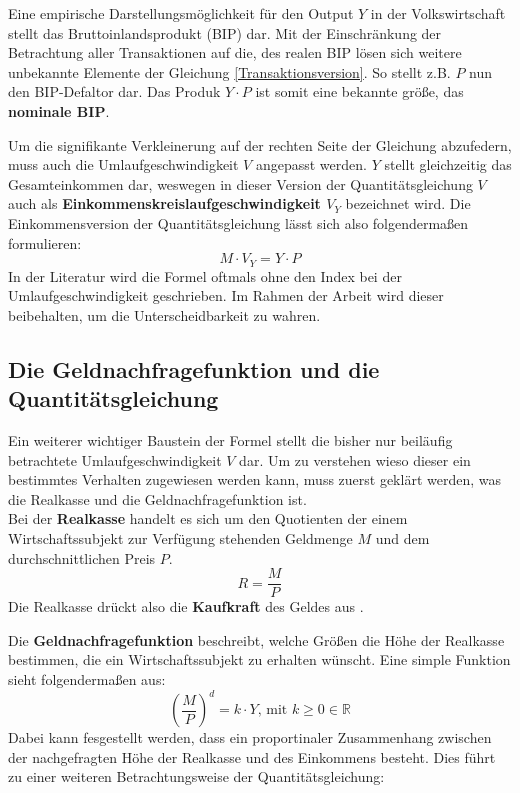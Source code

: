 Eine empirische Darstellungsmöglichkeit für den Output $Y$ in der Volkswirtschaft stellt das Bruttoinlandsprodukt (BIP) dar. Mit der Einschränkung der Betrachtung aller Transaktionen auf die, des realen BIP lösen sich weitere unbekannte Elemente der Gleichung \vref{Transaktionsversion}. So stellt z.B. $P$ nun den BIP-Defaltor dar. Das Produk $Y \cdot P$ ist somit eine bekannte größe, das \textbf{nominale BIP}\autocite*[125]{mankiw2017}.

Um die signifikante Verkleinerung auf der rechten Seite der Gleichung abzufedern, muss auch die Umlaufgeschwindigkeit $V$ angepasst werden. $Y$ stellt gleichzeitig das Gesamteinkommen dar, weswegen in dieser Version der Quantitätsgleichung $V$ auch als \textbf{Einkommenskreislaufgeschwindigkeit $V_Y$} bezeichnet wird. Die Einkommensversion der Quantitätsgleichung lässt sich also folgendermaßen formulieren:
\begin{equation}
    \tag{Einkommensversion}
    M \cdot V_Y = Y \cdot P
\end{equation}\label{Einkommensversion}
In der Literatur wird die Formel oftmals ohne den Index bei der Umlaufgeschwindigkeit geschrieben. Im Rahmen der Arbeit wird dieser beibehalten, um die Unterscheidbarkeit zu wahren.

\subsection{Die Geldnachfragefunktion und die Quantitätsgleichung}

Ein weiterer wichtiger Baustein der Formel stellt die bisher nur beiläufig betrachtete Umlaufgeschwindigkeit $V$ dar. Um zu verstehen wieso dieser ein bestimmtes Verhalten zugewiesen werden kann, muss zuerst geklärt werden, was die Realkasse und die Geldnachfragefunktion ist.\\
Bei der \textbf{Realkasse} handelt es sich um den Quotienten der einem Wirtschaftssubjekt zur Verfügung stehenden Geldmenge $M$ und dem durchschnittlichen Preis $P$.
$$ R = \frac{M}{P}$$
Die Realkasse drückt also die \textbf{Kaufkraft} des Geldes aus \autocite[125f]{mankiw2017}.

Die \textbf{Geldnachfragefunktion} beschreibt, welche Größen die Höhe der Realkasse bestimmen, die ein Wirtschaftssubjekt zu erhalten wünscht.
Eine simple Funktion sieht folgendermaßen aus:
$$(\frac{M}{P})^d=k \cdot Y\text{, mit } k \geq 0 \in \mathbb{R}$$\label{Geldnachfragefunktion}
Dabei kann fesgestellt werden, dass ein proportinaler Zusammenhang zwischen der nachgefragten Höhe der Realkasse und des Einkommens besteht. Dies führt zu einer weiteren Betrachtungsweise der Quantitätsgleichung:

